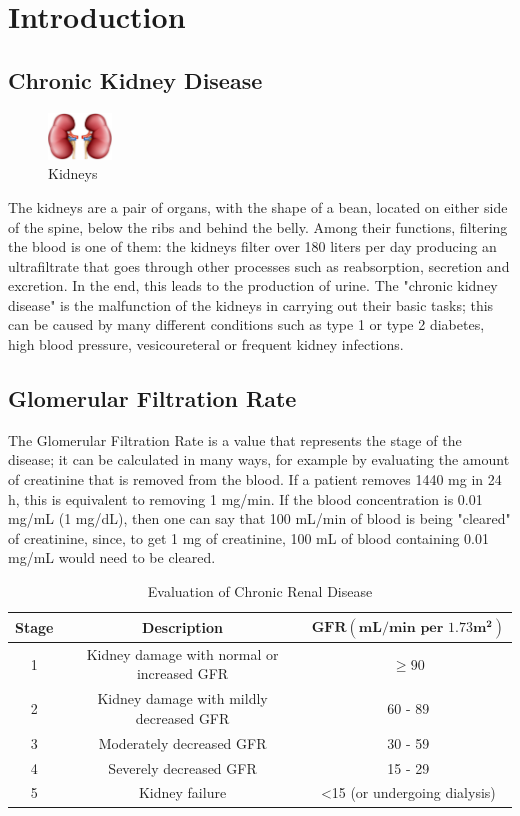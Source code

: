 \documentclass[10pt]{article}
\begin{document}
\section{Introduction}
\subsection{Chronic Kidney Disease}



\begin{figure} 
    \centering
    \includegraphics[width=0.15\textwidth]{kidney.png}
    \caption{Kidneys}
\end{figure}
The kidneys are a pair of organs, with the shape of a bean, located on either side of the spine, below the ribs and behind the belly. Among their functions, filtering the blood is one of them: the kidneys filter over 180 liters per day producing an ultrafiltrate that goes through other processes such as reabsorption, secretion and excretion. In the end, this leads to the production of urine. The "chronic kidney disease" is the malfunction of the kidneys in carrying out their basic tasks; this can be caused by many different conditions such as type 1 or type 2 diabetes, high blood pressure, vesicoureteral or frequent kidney infections.

\subsection{Glomerular Filtration Rate}
The Glomerular Filtration Rate is a value that represents the stage of the disease; it can be calculated in many ways, for example by evaluating the amount of creatinine that is removed from the blood. If a patient removes 1440 mg in 24 h, this is equivalent to removing 1 mg/min. If the blood concentration is 0.01 mg/mL (1 mg/dL), then one can say that 100 mL/min of blood is being "cleared" of creatinine, since, to get 1 mg of creatinine, 100 mL of blood containing 0.01 mg/mL would need to be cleared.
\begin{table}[htb]
\centering
\begin{tabular}{|ccc|}
\hline
\textbf{Stage} & \textbf{Description} & {$\mathbf {GFR \left( m L/min\textbf{ per } 1.73m^{2} \right)}$} \\ \hline
1 & Kidney damage with normal or increased GFR & $\geq 90$ \\ \hline
2 & Kidney damage with mildly decreased GFR & 60 - 89 \\ \hline
3 & Moderately decreased GFR & 30 - 59 \\ \hline
4 & Severely decreased GFR & 15 - 29 \\ \hline
5 & Kidney failure & \textless 15 (or undergoing dialysis) \\ \hline
\end{tabular}
\caption{Evaluation of Chronic Renal Disease}
\label{my-label}
\end{table}
\end{document}
